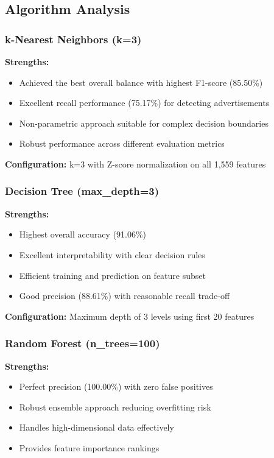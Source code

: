\subsection{Algorithm Analysis}

\subsubsection{k-Nearest Neighbors (k=3)}

\textbf{Strengths:}
\begin{itemize}
    \item Achieved the best overall balance with highest F1-score (85.50\%)
    \item Excellent recall performance (75.17\%) for detecting advertisements
    \item Non-parametric approach suitable for complex decision boundaries
    \item Robust performance across different evaluation metrics
\end{itemize}

\textbf{Configuration:} k=3 with Z-score normalization on all 1,559 features

\subsubsection{Decision Tree (max\_depth=3)}

\textbf{Strengths:}
\begin{itemize}
    \item Highest overall accuracy (91.06\%)
    \item Excellent interpretability with clear decision rules
    \item Efficient training and prediction on feature subset
    \item Good precision (88.61\%) with reasonable recall trade-off
\end{itemize}

\textbf{Configuration:} Maximum depth of 3 levels using first 20 features

\subsubsection{Random Forest (n\_trees=100)}

\textbf{Strengths:}
\begin{itemize}
    \item Perfect precision (100.00\%) with zero false positives
    \item Robust ensemble approach reducing overfitting risk
    \item Handles high-dimensional data effectively
    \item Provides feature importance rankings
\end{itemize}

